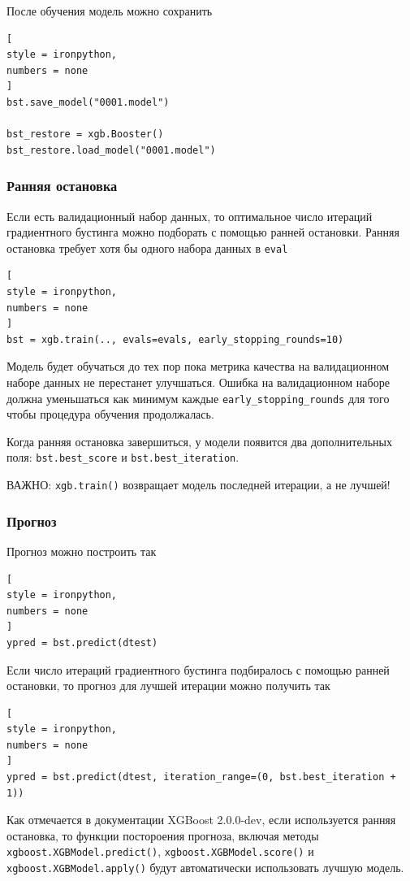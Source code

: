 \documentclass[%
	11pt,
	a4paper,
	utf8,
		]{article}
\begin{document}
После обучения модель можно сохранить 
\begin{lstlisting}[
style = ironpython,
numbers = none
]
bst.save_model("0001.model")

bst_restore = xgb.Booster()
bst_restore.load_model("0001.model")
\end{lstlisting}

\subsubsection{Ранняя остановка}

Если есть валидационный набор данных, то оптимальное число итераций градиентного бустинга можно подборать с помощью ранней остановки. Ранняя остановка требует хотя бы одного набора данных в \verb|eval|
\begin{lstlisting}[
style = ironpython,
numbers = none
]
bst = xgb.train(.., evals=evals, early_stopping_rounds=10)
\end{lstlisting}

Модель будет обучаться до тех пор пока метрика качества на валидационном наборе данных не перестанет улучшаться. Ошибка на валидационном наборе должна уменьшаться как минимум каждые \verb|early_stopping_rounds| для того чтобы процедура обучения продолжалась.

Когда ранняя остановка завершиться, у модели появится два дополнительных поля: \verb|bst.best_score| и \verb|bst.best_iteration|.

ВАЖНО: \verb|xgb.train()| возвращает модель последней итерации, а не лучшей!

\subsubsection{Прогноз}

Прогноз можно построить так
\begin{lstlisting}[
style = ironpython,
numbers = none
]
ypred = bst.predict(dtest)
\end{lstlisting}

Если число итераций градиентного бустинга подбиралось с помощью ранней остановки, то прогноз для лучшей итерации можно получить так
\begin{lstlisting}[
style = ironpython,
numbers = none
]
ypred = bst.predict(dtest, iteration_range=(0, bst.best_iteration + 1))
\end{lstlisting}

Как отмечается в документации XGBoost 2.0.0-dev, если используется ранняя остановка, то функции постороения прогноза, включая методы \verb|xgboost.XGBModel.predict()|, \verb|xgboost.XGBModel.score()| и \verb|xgboost.XGBModel.apply()| будут автоматически использовать лучшую модель.
\end{document}
